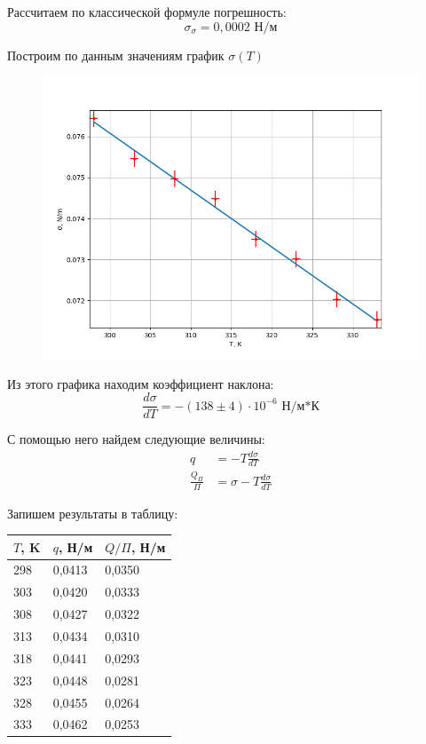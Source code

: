 \documentclass[12pt]{article}
\begin{document}
Рассчитаем по классической формуле погрешность:
\begin{equation*}
	\sigma_\sigma = 0,0002 \text{ Н/м}
\end{equation*}

Построим по данным значениям график $\sigma(T)$

\begin{figure}[H]
	\centering
	\includegraphics[scale=0.7]{./images/sigma.png}
\end{figure}

Из этого графика находим коэффициент наклона:
\begin{equation*}
	\frac{d\sigma}{dT} = - (138 \pm 4) \cdot 10^{-6} \text{ Н/м*К}
\end{equation*}

С помощью него найдем следующие величины:
\begin{align*}
	q &= -T\frac{d\sigma}{dT}\\
	\frac{Q_\Pi}{\Pi} &=\sigma - T\frac{d\sigma}{dT}
\end{align*}

Запишем результаты в таблицу:
\begin{table}[H]
	\centering
	\begin{tabular}{|l|l|l|}
		\hline
		$T$, K & $q$, Н/м          & $Q/\Pi$, Н/м      \\ \hline
		298    & 0,0413 & 0,0350 \\ \hline
		303    & 0,0420 & 0,0333 \\ \hline
		308    & 0,0427 & 0,0322 \\ \hline
		313    & 0,0434 & 0,0310 \\ \hline
		318    & 0,0441 & 0,0293 \\ \hline
		323    & 0,0448 & 0,0281 \\ \hline
		328    & 0,0455 & 0,0264 \\ \hline
		333    & 0,0462 & 0,0253 \\ \hline
	\end{tabular}
\end{table}
\end{document}

